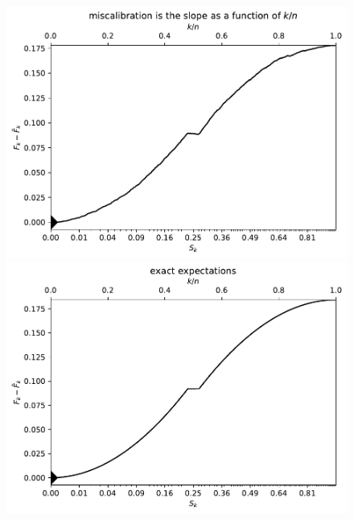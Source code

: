 \documentclass{article}
\begin{document}
\begin{figure}
\begin{centering}

\parbox{\imsize}{\includegraphics[width=\imsize]
                {./codes/unweighted/10000_10_1_2/cumulative.pdf}}
\quad\quad
\parbox{\imsize}{\includegraphics[width=\imsize]
                {./codes/unweighted/10000_10_1_2/cumulative_exact.pdf}}

\vspace{\vertsep}


\end{centering}
\end{figure}
\end{document}
